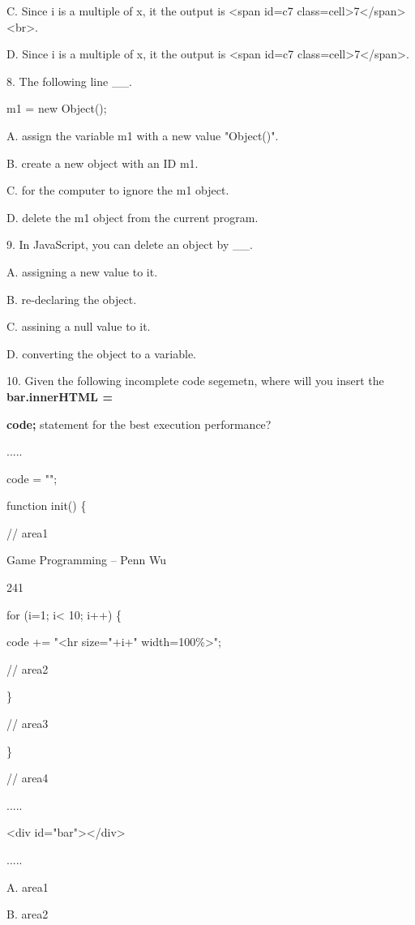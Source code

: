 \documentclass[
]{article}
\begin{document}
C. Since i is a multiple of x, it the output is \textless span id=c7
class=\textquotesingle cell\textquotesingle\textgreater7\textless/span\textgreater\textless br\textgreater.

D. Since i is a multiple of x, it the output is \textless span id=c7
class=\textquotesingle cell\textquotesingle\textgreater7\textless/span\textgreater.

8. The following line \_\_.

m1 = new Object();

A. assign the variable m1 with a new value "Object()".

B. create a new object with an ID m1.

C. for the computer to ignore the m1 object.

D. delete the m1 object from the current program.

9. In JavaScript, you can delete an object by \_\_.

A. assigning a new value to it.

B. re-declaring the object.

C. assining a null value to it.

D. converting the object to a variable.

10. Given the following incomplete code segemetn, where will you insert
the \textbf{bar.innerHTML =}

\textbf{code;} statement for the best execution performance?

.....

code = "";

function init() \{

// area1

Game Programming -- Penn Wu

241

\protect\hypertarget{index_split_012.htmlux5cux23p242}{}{} for (i=1;
i\textless{} 10; i++) \{

code += "\textless hr size="+i+" width=100\%\textgreater";

// area2

\}

// area3

\}

// area4

.....

\textless div id="bar"\textgreater\textless/div\textgreater{}

.....

A. area1

B. area2
\end{document}
